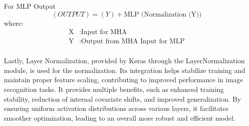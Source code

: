 For MLP Output
\[(OUTPUT) = (Y)+\text{MLP (Normalization (Y))}\]
where:
\begin{align*}
    \text{X} & : \text{Input for MHA}                 \\
    \text{Y} & : \text{Output from MHA Input for MLP} \\
\end{align*}

Lastly, Layer Normalization, provided by Keras through the LayerNormalization module, is used for the normalization. Its integration helps stabilize training and maintain proper feature scaling, contributing to improved performance in image recognition tasks. It provides multiple benefits, such as enhanced training stability, reduction of internal covariate shifts, and improved generalization. By ensuring uniform activation distributions across various layers, it facilitates smoother optimization, leading to an overall more robust and efficient model.